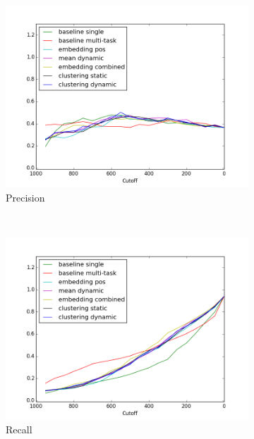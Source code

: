 \documentclass{article}
\begin{document}
\def \officialRunWidth {0.23\textwidth}
\begin{figure}[tb]
  \centering
    \begin{subfigure}[b]{\officialRunWidth}
            \includegraphics[width=\textwidth]{fig/macroPrecision}
			\caption{Precision}
			\label{official:macroprec}
    \end{subfigure}
    ~
    \begin{subfigure}[b]{\officialRunWidth}
            \includegraphics[width=\textwidth]{fig/macroRecall}
			\caption{Recall}
			\label{official:macrorecall}
    \end{subfigure}
    ~
    \begin{subfigure}[b]{\officialRunWidth}

\end{subfigure}
\end{figure}
\end{document}
